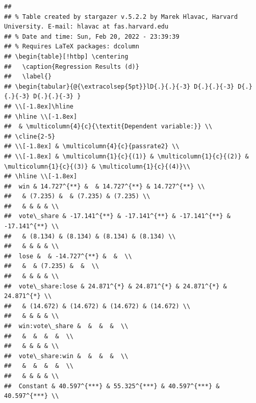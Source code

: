 \documentclass[
  12pt,
  landscape]{article}
\begin{document}
\begin{verbatim}
## 
## % Table created by stargazer v.5.2.2 by Marek Hlavac, Harvard University. E-mail: hlavac at fas.harvard.edu
## % Date and time: Sun, Feb 20, 2022 - 23:39:39
## % Requires LaTeX packages: dcolumn 
## \begin{table}[!htbp] \centering 
##   \caption{Regression Results (d)} 
##   \label{} 
## \begin{tabular}{@{\extracolsep{5pt}}lD{.}{.}{-3} D{.}{.}{-3} D{.}{.}{-3} D{.}{.}{-3} } 
## \\[-1.8ex]\hline 
## \hline \\[-1.8ex] 
##  & \multicolumn{4}{c}{\textit{Dependent variable:}} \\ 
## \cline{2-5} 
## \\[-1.8ex] & \multicolumn{4}{c}{passrate2} \\ 
## \\[-1.8ex] & \multicolumn{1}{c}{(1)} & \multicolumn{1}{c}{(2)} & \multicolumn{1}{c}{(3)} & \multicolumn{1}{c}{(4)}\\ 
## \hline \\[-1.8ex] 
##  win & 14.727^{**} &  & 14.727^{**} & 14.727^{**} \\ 
##   & (7.235) &  & (7.235) & (7.235) \\ 
##   & & & & \\ 
##  vote\_share & -17.141^{**} & -17.141^{**} & -17.141^{**} & -17.141^{**} \\ 
##   & (8.134) & (8.134) & (8.134) & (8.134) \\ 
##   & & & & \\ 
##  lose &  & -14.727^{**} &  &  \\ 
##   &  & (7.235) &  &  \\ 
##   & & & & \\ 
##  vote\_share:lose & 24.871^{*} & 24.871^{*} & 24.871^{*} & 24.871^{*} \\ 
##   & (14.672) & (14.672) & (14.672) & (14.672) \\ 
##   & & & & \\ 
##  win:vote\_share &  &  &  &  \\ 
##   &  &  &  &  \\ 
##   & & & & \\ 
##  vote\_share:win &  &  &  &  \\ 
##   &  &  &  &  \\ 
##   & & & & \\ 
##  Constant & 40.597^{***} & 55.325^{***} & 40.597^{***} & 40.597^{***} \\ 

\end{verbatim}
\end{document}
